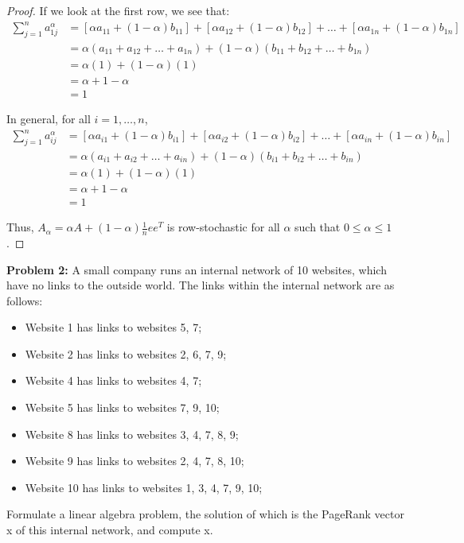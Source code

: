 \documentclass[12pt]{article}
\begin{document}
\begin{proof}
If we look at the first row, we see that:
\begin{align}
\sum_{j=1}^n a^{\alpha}_{1j} &= [\alpha a_{11} + (1-\alpha)b_{11}] + 		[\alpha a_{12}+(1-\alpha)b_{12}] + \dots + [\alpha a_{1n}				+(1-	\alpha)b_{1n}] \nonumber \\
&= \alpha (a_{11} + a_{12} + \dots + a_{1n}) + (1-\alpha)(b_{11} + b_{12} + \dots + b_{1n}) \nonumber \\
&= \alpha(1) + (1-\alpha)(1) \nonumber \\
&= \alpha + 1 - \alpha \nonumber \\
&= 1 \nonumber
\end{align}

In general, for all $i = 1, \dots , n$,
\begin{align}
\sum_{j=1}^n a^{\alpha}_{ij} &= [\alpha a_{i1} + (1-\alpha)b_{i1}] + 		[\alpha a_{i2}+(1-\alpha)b_{i2}] + \hdots + [\alpha a_{in}			+(1-	\alpha)b_{in}] \nonumber \\
&= \alpha (a_{i1} + a_{i2} + \dots + a_{in}) + (1-\alpha)(b_{i1} + 		b_{i2} + \dots + b_{in}) \nonumber \\
&= \alpha(1) + (1-\alpha)(1) \nonumber \\
&= \alpha + 1 - \alpha \nonumber \\
&= 1 \nonumber
\end{align}

Thus, $A_{\alpha} = \alpha A + (1-\alpha)\frac{1}{n}ee^T$ is row-stochastic for all $\alpha$ such that $0 \leq \alpha \leq 1$.

\end{proof}

\newpage
\bigskip\bigskip
\noindent
\textbf{Problem 2:} A small company runs an internal network of 10 websites, which have no links to the outside world.  The links within the internal network are as follows:\\
\begin{itemize}
\item Website 1 has links to websites 5, 7;
\item Website 2 has links to websites 2, 6, 7, 9;
\item Website 4 has links to websites 4, 7;
\item Website 5 has links to websites 7, 9, 10;
\item Website 8 has links to websites 3, 4, 7, 8, 9;
\item Website 9 has links to websites 2, 4, 7, 8, 10;
\item Website 10 has links to websites 1, 3, 4, 7, 9, 10;
\end{itemize}
Formulate a linear algebra  problem, the solution of which is the PageRank vector x of this internal network, and compute x.\\
\end{document}
